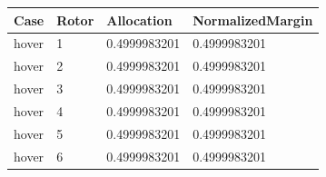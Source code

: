 \begin{tabular}{@{}llll@{}}
\toprule
Case & Rotor & Allocation & NormalizedMargin \\
\midrule
hover & 1 & 0.4999983201 & 0.4999983201 \\
hover & 2 & 0.4999983201 & 0.4999983201 \\
hover & 3 & 0.4999983201 & 0.4999983201 \\
hover & 4 & 0.4999983201 & 0.4999983201 \\
hover & 5 & 0.4999983201 & 0.4999983201 \\
hover & 6 & 0.4999983201 & 0.4999983201 \\
\bottomrule
\end{tabular}
